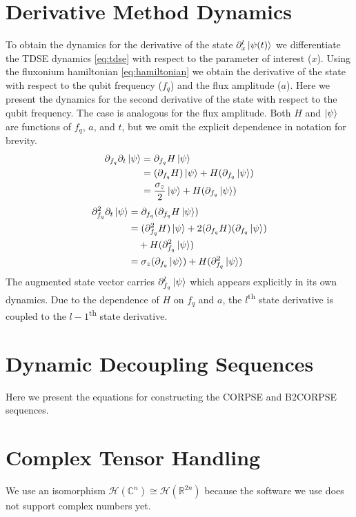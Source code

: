\documentclass[
  amsfonts,
  amsmath,
  tbtags,
  amssymb,
  aps,
  nobibnotes,
  twocolumn,
  superscriptaddress,
]{revtex4-2}
\begin{document}
\section{Derivative Method Dynamics}
To obtain the dynamics for the derivative of the state $\partial_{x}^{l} \ket{\psi(t)}$
we differentiate the TDSE dynamics \ref{eq:tdse} with respect to the parameter of interest
($x$). Using the fluxonium hamiltonian \ref{eq:hamiltonian} we obtain the derivative of the
state with respect to the qubit frequency ($f_{q}$) and the flux amplitude ($a$).
Here we present the dynamics for the second derivative of the state with respect to the
qubit frequency. The case is analogous for the flux amplitude. Both $H$ and $\ket{\psi}$ are functions
of $f_{q}$, $a$, and $t$, but we omit the explicit dependence in notation for
brevity.
\begin{equation}
  \begin{aligned}
      \partial_{f_{q}} \partial_{t} \ket{\psi} &= \partial_{f_{q}} H \ket{\psi}\\
      &= (\partial_{f_{q}} H) \ket{\psi} + H (\partial_{f_{q}} \ket{\psi})\\
      &= \frac{\sigma_{z}}{2} \ket{\psi} + H (\partial_{f_{q}} \ket{\psi})
  \end{aligned}
\end{equation}
\begin{equation}
  \begin{aligned}
    \partial_{f_{q}}^{2} \partial_{t} \ket{\psi} &= \partial_{f_{q}} (\partial_{f_{q}} H \ket{\psi})\\
    &= (\partial_{f_{q}}^{2} H) \ket{\psi} + 2 (\partial_{f_{q}} H)(\partial_{f_{q}} \ket{\psi})\\
    &\quad + H (\partial_{f_{q}}^{2} \ket{\psi})\\
    &= \sigma_{z} (\partial_{f_{q}} \ket{\psi}) + H (\partial_{f_{q}}^{2} \ket{\psi})
  \end{aligned}
\end{equation}
The augmented state vector carries $\partial_{f_{q}}^{l} \ket{\psi}$
which appears explicitly in its own dynamics. Due to the dependence of $H$ on $f_{q}$ and $a$,
the $l$\textsuperscript{th} state derivative is coupled to the
$l - 1$\textsuperscript{th} state derivative.


\section{Dynamic Decoupling Sequences}
Here we present the equations for constructing the CORPSE and
B2CORPSE sequences.


\section{Complex Tensor Handling}
We use an isomorphism $\mathcal{H}(\mathbb{C}^{n}) \cong \mathcal{H}(\mathbb{R}^{2n})$
because the software we use does not support complex numbers yet.



\end{document}
